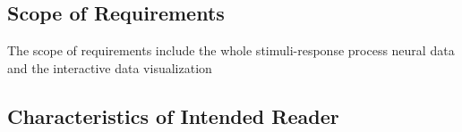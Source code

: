 \documentclass[12pt]{article}
\begin{document}

\subsection{Scope of Requirements} 

The scope of requirements include the whole stimuli-response process neural data
and the interactive data visualization
%
%

\subsection{Characteristics of Intended Reader} \label{sec_IntendedReader}
\end{document}

